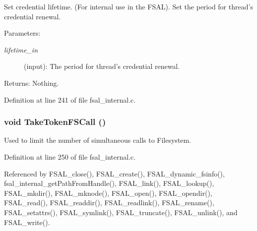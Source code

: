 Set credential lifetime. (For internal use in the FSAL). Set the period for thread's credential renewal.

\begin{Desc}
\item[Parameters:]
\begin{description}
\item[{\em lifetime\_\-in}](input): The period for thread's credential renewal.\end{description}
\end{Desc}
\begin{Desc}
\item[Returns:]Nothing. \end{Desc}


Definition at line 241 of file fsal\_\-internal.c.
\subsubsection[{TakeTokenFSCall}]{\setlength{\rightskip}{0pt plus 5cm}void TakeTokenFSCall ()}\label{fsal__internal_8c_880a1463c400047bfd0401f0b9c431a7}


Used to limit the number of simultaneous calls to Filesystem. 

Definition at line 250 of file fsal\_\-internal.c.

Referenced by FSAL\_\-close(), FSAL\_\-create(), FSAL\_\-dynamic\_\-fsinfo(), fsal\_\-internal\_\-getPathFromHandle(), FSAL\_\-link(), FSAL\_\-lookup(), FSAL\_\-mkdir(), FSAL\_\-mknode(), FSAL\_\-open(), FSAL\_\-opendir(), FSAL\_\-read(), FSAL\_\-readdir(), FSAL\_\-readlink(), FSAL\_\-rename(), FSAL\_\-setattrs(), FSAL\_\-symlink(), FSAL\_\-truncate(), FSAL\_\-unlink(), and FSAL\_\-write().
